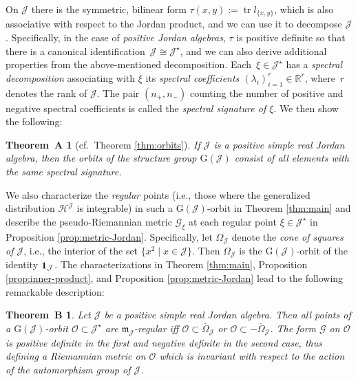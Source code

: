 \documentclass[pdftex]{sigma}
\numberwithin{equation}{section}
\newtheorem*{TheoremA*}{Theorem~A}
\newtheorem*{TheoremB*}{Theorem~B}
\newcommand{\hh}{\mathcal{H}}
\newcommand{\ocal}{\mathcal{O}}
\newcommand{\Jcal}{\mathcal{J}}
\newcommand{\m}{\mathfrak{m}}
\newcommand{\G}{\mathrm{G}}
\newcommand{\R}{{\mathbb R}}
\renewcommand{\m}{{\mathfrak m}}
\newcommand{\Gcal}{\mathcal{G}}
\begin{document}
On $\Jcal$ there is the symmetric, bilinear form $\tau(x,y) := \operatorname{tr} l_{\{x, y\}}$, which is also associative with respect to the Jordan product, and we can use it to decompose $\Jcal$ \cite[p.~59]{Koecher-1999}.
Specifically, in the case of {\em positive Jordan algebras}, $\tau$ is positive definite so that there is a canonical identification~${\Jcal \cong \Jcal^\star}$, and we can also derive additional properties from the above-mentioned decomposition.
Each~$\xi \in \Jcal^\star$ has a {\em spectral decomposition} associating with $\xi$ its {\em spectral coefficients $(\lambda_i)_{i=1}^r \in \R^r$}, where~$r$ denotes the rank of $\Jcal$. The pair $(n_+, n_-)$ counting the number of positive and negative spectral coefficients is called the {\em spectral signature of $\xi$}. We then show the following:

\begin{TheoremA*}[cf.\ Theorem \ref{thm:orbits}]
If $\Jcal$ is a positive simple real Jordan algebra, then the orbits of the structure group $\G(\Jcal)$ consist of all elements with the same spectral signature.
\end{TheoremA*}

We also characterize the {\em regular }points (i.e., those where the
generalized distribution $\hh^\Jcal$ is integrable) in such a $\G(\Jcal)$-orbit in Theorem \ref{thm:main} and describe the pseudo-Riemannian metric $\Gcal_\xi$ at each regular point $\xi \in \Jcal^\star$ in Proposition \ref{prop:metric-Jordan}.
Specifically, let $\Omega_\Jcal$ denote the {\em cone of squares of $\Jcal$}, i.e., the interior of the set $\big\{x^2 \mid x \in \Jcal\big\}$. Then $\Omega_\Jcal$ is the $\G(\Jcal)$-orbit of the identity ${\bf 1}_\Jcal$.
 The characterizations in Theorem \ref{thm:main}, Proposition \ref{prop:inner-product}, and Proposition \ref{prop:metric-Jordan} lead to the following remarkable description:

\begin{TheoremB*} Let $\Jcal$ be a positive simple real Jordan
 algebra. Then all points of a $\G(\Jcal)$-orbit $\ocal \subset \Jcal^\star$ are $\m_{\Jcal}$-regular iff $\ocal \subset \overline{\Omega}_\Jcal$ or $\ocal \subset -\overline{\Omega}_\Jcal$. The form $\Gcal$ on $\ocal$ is positive definite in the first and negative definite in the second case, thus defining a Riemannian metric on $\ocal$ which is invariant with respect to the action of the automorphism group of $\Jcal$.
\end{TheoremB*}
\end{document}
